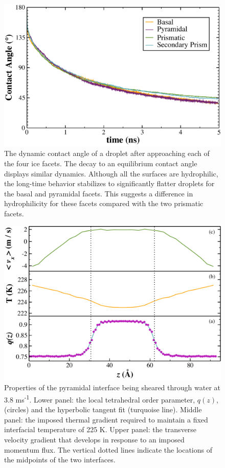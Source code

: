 \documentclass{pnastwo}
\begin{document}
\begin{figure}
\includegraphics[width=\linewidth]{ContactAngle}
\caption{\label{fig:ContactAngle} The dynamic contact angle of a
  droplet after approaching each of the four ice facets.  The decay to
  an equilibrium contact angle displays similar dynamics.  Although
  all the surfaces are hydrophilic, the long-time behavior stabilizes
  to significantly flatter droplets for the basal and pyramidal
  facets.  This suggests a difference in hydrophilicity for these
  facets compared with the two prismatic facets.}
\end{figure}


\begin{figure}
\includegraphics[width=\linewidth]{Pyr_comic_strip}
\caption{\label{fig:pyrComic} Properties of the pyramidal interface
  being sheared through water at 3.8 ms\textsuperscript{-1}. Lower
  panel: the local tetrahedral order parameter, $q(z)$, (circles) and
  the hyperbolic tangent fit (turquoise line).  Middle panel: the
  imposed thermal gradient required to maintain a fixed interfacial
  temperature of 225 K. Upper panel: the transverse velocity gradient
  that develops in response to an imposed momentum flux. The vertical
  dotted lines indicate the locations of the midpoints of the two
  interfaces.}
\end{figure}
\end{document}

